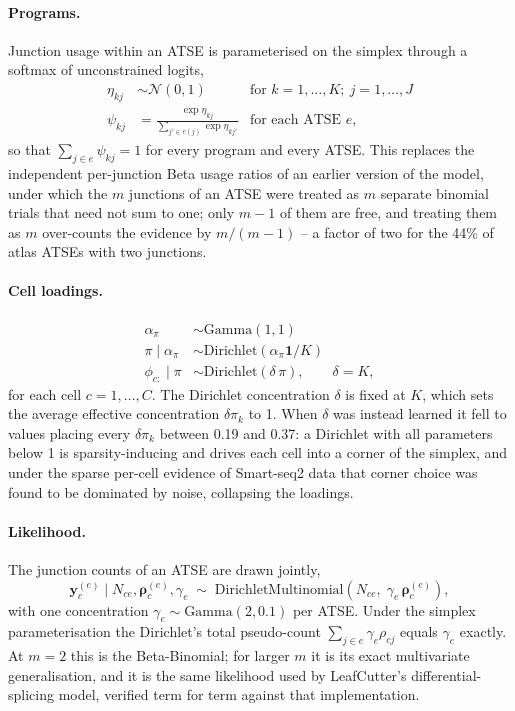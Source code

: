 \paragraph{Programs.} Junction usage within an ATSE is parameterised on the simplex through a softmax of unconstrained logits,
\begin{align*}
    \eta_{kj} &\sim \mathcal{N}(0, 1) & \text{for } k = 1,\ldots,K;\ j = 1,\ldots,J \\
    \psi_{kj} &= \frac{\exp \eta_{kj}}{\sum_{j' \in e(j)} \exp \eta_{kj'}} & \text{for each ATSE } e,
\end{align*}
so that $\sum_{j \in e} \psi_{kj} = 1$ for every program and every ATSE. This replaces the independent per-junction Beta usage ratios of an earlier version of the model, under which the $m$ junctions of an ATSE were treated as $m$ separate binomial trials that need not sum to one; only $m-1$ of them are free, and treating them as $m$ over-counts the evidence by $m/(m-1)$ -- a factor of two for the 44\% of atlas ATSEs with two junctions.

\paragraph{Cell loadings.} 
\begin{align*}
    \alpha_\pi &\sim \text{Gamma}(1, 1) \\
    \pi \mid \alpha_\pi &\sim \text{Dirichlet}(\alpha_\pi\mathbf{1}/K) \\
    \phi_{c:} \mid \pi &\sim \text{Dirichlet}(\delta\,\pi), \qquad \delta = K,
\end{align*}
for each cell $c = 1, \ldots, C$. The Dirichlet concentration $\delta$ is fixed at $K$, which sets the average effective concentration $\delta\pi_k$ to 1. When $\delta$ was instead learned it fell to values placing every $\delta\pi_k$ between 0.19 and 0.37: a Dirichlet with all parameters below 1 is sparsity-inducing and drives each cell into a corner of the simplex, and under the sparse per-cell evidence of Smart-seq2 data that corner choice was found to be dominated by noise, collapsing the loadings.

\paragraph{Likelihood.} The junction counts of an ATSE are drawn jointly,
$$\mathbf{y}_c^{(e)} \mid N_{ce}, \boldsymbol{\rho}_c^{(e)}, \gamma_e \;\sim\; \text{DirichletMultinomial}\!\left(N_{ce},\; \gamma_e\,\boldsymbol{\rho}_c^{(e)}\right),$$
with one concentration $\gamma_e \sim \text{Gamma}(2, 0.1)$ per ATSE. Under the simplex parameterisation the Dirichlet's total pseudo-count $\sum_{j\in e} \gamma_e \rho_{cj}$ equals $\gamma_e$ exactly. At $m = 2$ this is the Beta-Binomial; for larger $m$ it is its exact multivariate generalisation, and it is the same likelihood used by LeafCutter's differential-splicing model, verified term for term against that implementation.

